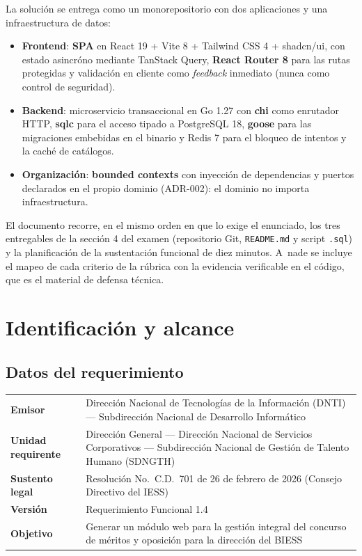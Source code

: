 \documentclass[11pt,a4paper]{article}
\newcommand{\ent}[1]{\textsf{\textbf{#1}}}
\newcommand{\code}[1]{\texttt{#1}}
\begin{document}
La soluci\'on se entrega como un monorepositorio con dos aplicaciones y una infraestructura de datos:

\begin{itemize}
  \item \textbf{Frontend}: \ent{SPA} en React 19 + Vite 8 + Tailwind CSS 4 + shadcn/ui, con estado
  asincr\'ono mediante TanStack Query, \ent{React Router 8} para las rutas protegidas y validaci\'on en
  cliente como \emph{feedback} inmediato (nunca como control de seguridad).
  \item \textbf{Backend}: microservicio transaccional en Go 1.27 con \ent{chi} como enrutador HTTP,
  \ent{sqlc} para el acceso tipado a PostgreSQL 18, \ent{goose} para las migraciones embebidas en el
  binario y Redis 7 para el bloqueo de intentos y la cach\'e de cat\'alogos.
  \item \textbf{Organizaci\'on}: \ent{bounded contexts} con inyecci\'on de dependencias y puertos
  declarados en el propio dominio (ADR-002): el dominio no importa infraestructura.
\end{itemize}

El documento recorre, en el mismo orden en que lo exige el enunciado, los tres entregables de la secci\'on 4
del examen (repositorio Git, \code{README.md} y script \code{.sql}) y la planificaci\'on de la sustentaci\'on
funcional de diez minutos. A~nade se incluye el mapeo de cada criterio de la r\'ubrica con la evidencia
verificable en el c\'odigo, que es el material de defensa t\'ecnica.

\section{Identificaci\'on y alcance}

\subsection{Datos del requerimiento}

\begin{tabularx}{\textwidth}{@{}>{\bfseries\color{upseAzul}}l X@{}}
\toprule
Emisor & Direcci\'on Nacional de Tecnolog\'ias de la Informaci\'on (DNTI) --- Subdirecci\'on Nacional de Desarrollo Inform\'atico \\
Unidad requirente & Direcci\'on General --- Direcci\'on Nacional de Servicios Corporativos --- Subdirecci\'on Nacional de Gesti\'on de Talento Humano (SDNGTH) \\
Sustento legal & Resoluci\'on No.\ C.D.\ 701 de 26 de febrero de 2026 (Consejo Directivo del IESS) \\
Versi\'on & Requerimiento Funcional 1.4 \\
Objetivo & Generar un m\'odulo web para la gesti\'on integral del concurso de m\'eritos y oposici\'on para la direcci\'on del BIESS \\
\bottomrule
\end{tabularx}
\end{document}
